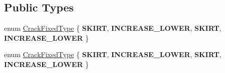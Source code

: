 \subsection*{Public Types}
\begin{DoxyCompactItemize}
\item 
enum \hyperlink{classTerrain_af3dc2d6c44474fdbd9552d69e553ef93}{Crack\+Fixed\+Type} \{ {\bfseries S\+K\+I\+RT}, 
{\bfseries I\+N\+C\+R\+E\+A\+S\+E\+\_\+\+L\+O\+W\+ER}, 
{\bfseries S\+K\+I\+RT}, 
{\bfseries I\+N\+C\+R\+E\+A\+S\+E\+\_\+\+L\+O\+W\+ER}
 \}
\item 
enum \hyperlink{classTerrain_af3dc2d6c44474fdbd9552d69e553ef93}{Crack\+Fixed\+Type} \{ {\bfseries S\+K\+I\+RT}, 
{\bfseries I\+N\+C\+R\+E\+A\+S\+E\+\_\+\+L\+O\+W\+ER}, 
{\bfseries S\+K\+I\+RT}, 
{\bfseries I\+N\+C\+R\+E\+A\+S\+E\+\_\+\+L\+O\+W\+ER}
 \}
\end{DoxyCompactItemize}

